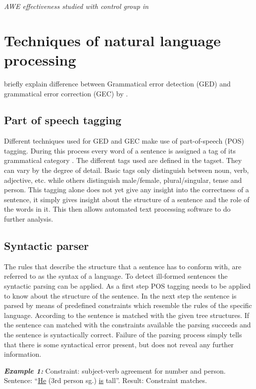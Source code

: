 \documentclass[runningheads]{llncs}
\begin{document}
\vspace*{6mm}\hspace*{6mm} \textit{AWE effectiveness studied with control group in \cite{wang_exploring_2013}}  \par


\section{Techniques of natural language processing}
briefly explain difference between Grammatical error detection (GED) and grammatical error correction (GEC) by \cite{bell_context_2019}.

\subsection{Part of speech tagging}
Different techniques used for GED and GEC make use of part-of-speech (POS) tagging. During this process every word of a sentence is assigned a tag of its grammatical category \citep{noauthor_pos_2018}. The different tags used are defined in the tagset. They can vary by the degree of detail. Basic tags only distinguish between noun, verb, adjective, etc. while others distinguish male/female, plural/singular, tense and person. This tagging alone does not yet give any insight into the correctness of a sentence, it simply gives insight about the structure of a sentence and the role of the words in it. This then allows automated text processing software to do further analysis.

\subsection{Syntactic parser}   
The rules that describe the structure that a sentence has to conform with, are referred to as the syntax of a language. To detect ill-formed sentences the syntactic parsing can be applied. As a first step POS tagging needs to be applied to know about the structure of the sentence. In the next step the sentence is parsed by means of predefined constraints which resemble the rules of the specific language. According to \textcite{manchanda_various_2016} the sentence is matched with the given tree structures. If the sentence can matched with the constraints available the parsing succeeds and the sentence is syntactically correct. Failure of the parsing process simply tells that there is some syntactical error present, but does not reveal any further information.

\textbf{\textit{Example 1:}} Constraint: subject-verb agreement for number and person. Sentence: ``\underline{He} (3rd person sg.) \underline{is} tall''. Result: Constraint matches.
\end{document}
